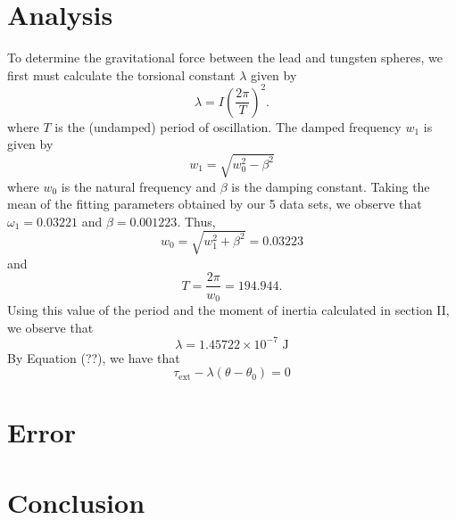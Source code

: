 \documentclass[aps, reprint,amsmath,amssymb]{revtex4-1} %
\begin{document}
\section{Analysis}

To determine the gravitational force between the lead and tungsten spheres, we first must calculate the torsional constant $\lambda$ given by
$$
\lambda = I \left( \frac{2 \pi}{T} \right)^2.
$$
where $T$ is the (undamped) period of oscillation. The damped frequency $w_1$ is given by
$$
w_1 = \sqrt{w_0^2-\beta^2}
$$
where $w_0$ is the natural frequency and $\beta$ is the damping constant. Taking the mean of the fitting parameters obtained by our 5 data sets, we observe that $\omega_1 = 0.03221$ and $\beta = 0.001223$. Thus, 
$$
w_0 = \sqrt{w_1^2+\beta^2} = 0.03223
$$
and
$$
T = \frac{2\pi}{w_0} = 194.944.
$$
Using this value of the period and the moment of inertia calculated in section II, we observe that
$$
\lambda = 1.45722 \times 10^{-7} \text{ J}
$$
By Equation (??), we have that
$$
\tau_{\text{ext}} - \lambda(\theta - \theta_0) = 0
$$

\section{Error}

\section{Conclusion}
\end{document}
